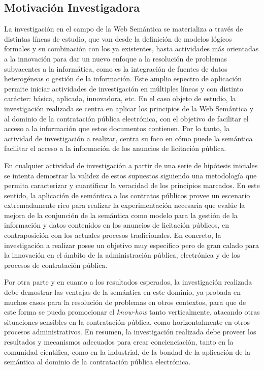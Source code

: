 \subsection{Motivación Investigadora}
La investigación en el campo de la Web Semántica se materializa a través de distintas
líneas de estudio, que van desde la definición de modelos lógicos formales y 
su combinación con los ya existentes, hasta actividades más orientadas a la innovación para dar un nuevo
enfoque a la resolución de problemas subyacentes a la informática, como es la integración
de fuentes de datos heterogéneas o gestión de la información. Este amplio espectro
de aplicación permite iniciar actividades de investigación en múltiples líneas
y con distinto carácter: básica, aplicada, innovadora, etc. En el caso objeto de estudio, la investigación
realizada se centra en aplicar los principios de la Web Semántica y \linkeddata al dominio
de la contratación pública electrónica, con el objetivo de facilitar el acceso a la información que estos
documentos contienen. Por lo tanto, la actividad de investigación a realizar, centra su foco
en cómo puede la semántica facilitar el acceso a la información de los anuncios
de licitación pública. 

En cualquier actividad de investigación a partir de una serie de hipótesis iniciales se intenta demostrar la validez 
de estos supuestos siguiendo una metodología que permita caracterizar y cuantificar la veracidad de los principios marcados. En este sentido, la aplicación
de semántica a los contratos públicos provee un escenario extremadamente rico para realizar la 
experimentación necesaria que evalúe la mejora de la conjunción de la semántica como modelo
para la gestión de la información y datos contenidos en los anuncios de licitación públicos, en contraposición
con los actuales procesos tradicionales. En concreto, la investigación a realizar posee un objetivo
muy específico pero de gran calado para la innovación en el ámbito de la administración pública, electrónica
y de los procesos de contratación pública.

Por otra parte y en cuanto a los resultados esperados, la investigación realizada debe demostrar
las ventajas de la semántica en este dominio, ya probada en muchos casos para la resolución de problemas en otros contextos, 
para que de este forma se pueda promocionar el \textit{know-how} tanto verticalmente, atacando otras
situaciones sensibles en la contratación pública, como horizontalmente en otros procesos
administrativos. En resumen, la investigación realizada debe proveer los resultados y mecanismos
adecuados para crear concienciación, tanto en la comunidad científica, como en la industrial, de la bondad
de la aplicación de la semántica al dominio de la contratación pública electrónica.

